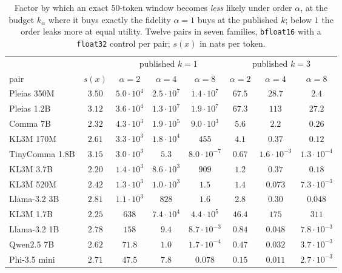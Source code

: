 \begin{table}[ht]
\centering\footnotesize
\caption{Factor by which an exact $50$-token window becomes \emph{less} likely under order $\alpha$, at the
budget $k_\alpha$ where it buys exactly the fidelity $\alpha{=}1$ buys at the published $k$; below $1$ the
order leaks more at equal utility. Twelve pairs in seven families, \texttt{bfloat16} with a
\texttt{float32} control per pair; $s(x)$ in nats per token.}\label{tab:orderlaw}
\setlength{\tabcolsep}{4pt}
\begin{tabular}{@{}lccccccc@{}}
\toprule
& & \multicolumn{3}{c}{published $k = 1$} & \multicolumn{3}{c}{published $k = 3$} \\
\cmidrule(lr){3-5}\cmidrule(lr){6-8}
pair & $s(x)$ & $\alpha{=}2$ & $\alpha{=}4$ & $\alpha{=}8$ & $\alpha{=}2$ & $\alpha{=}4$ & $\alpha{=}8$ \\
\midrule
Pleias 350M    & $3.50$ & $5.0{\cdot}10^{4}$ & $2.5{\cdot}10^{7}$ & $1.4{\cdot}10^{7}$ & $67.5$ & $28.7$ & $2.4$ \\
Pleias 1.2B    & $3.12$ & $3.6{\cdot}10^{4}$ & $1.3{\cdot}10^{7}$ & $1.9{\cdot}10^{7}$ & $67.3$ & $113$ & $27.2$ \\
Comma 7B       & $2.32$ & $4.3{\cdot}10^{3}$ & $1.9{\cdot}10^{5}$ & $9.0{\cdot}10^{3}$ & $5.6$ & $2.2$ & $0.26$ \\
KL3M 170M      & $2.61$ & $3.3{\cdot}10^{3}$ & $1.8{\cdot}10^{4}$ & $455$ & $4.1$ & $0.37$ & $0.12$ \\
TinyComma 1.8B & $3.15$ & $3.0{\cdot}10^{3}$ & $5.3$ & $8.0{\cdot}10^{-7}$ & $0.67$ & $1.6{\cdot}10^{-3}$ & $1.3{\cdot}10^{-4}$ \\
KL3M 3.7B      & $2.20$ & $1.4{\cdot}10^{3}$ & $8.6{\cdot}10^{3}$ & $909$ & $1.2$ & $0.37$ & $0.18$ \\
KL3M 520M      & $2.42$ & $1.3{\cdot}10^{3}$ & $1.0{\cdot}10^{3}$ & $1.5$ & $1.4$ & $0.073$ & $7.3{\cdot}10^{-3}$ \\
Llama-3.2 3B   & $2.81$ & $1.1{\cdot}10^{3}$ & $828$ & $1.6$ & $2.8$ & $0.30$ & $0.048$ \\
KL3M 1.7B      & $2.25$ & $638$ & $7.4{\cdot}10^{4}$ & $4.4{\cdot}10^{5}$ & $46.4$ & $175$ & $311$ \\
Llama-3.2 1B   & $2.78$ & $158$ & $9.4$ & $8.7{\cdot}10^{-3}$ & $0.84$ & $0.048$ & $7.8{\cdot}10^{-3}$ \\
Qwen2.5 7B     & $2.62$ & $71.8$ & $1.0$ & $1.7{\cdot}10^{-4}$ & $0.47$ & $0.032$ & $3.7{\cdot}10^{-3}$ \\
Phi-3.5 mini   & $2.71$ & $47.5$ & $7.8$ & $0.078$ & $0.15$ & $0.011$ & $2.7{\cdot}10^{-3}$ \\
\bottomrule
\end{tabular}
\end{table}

